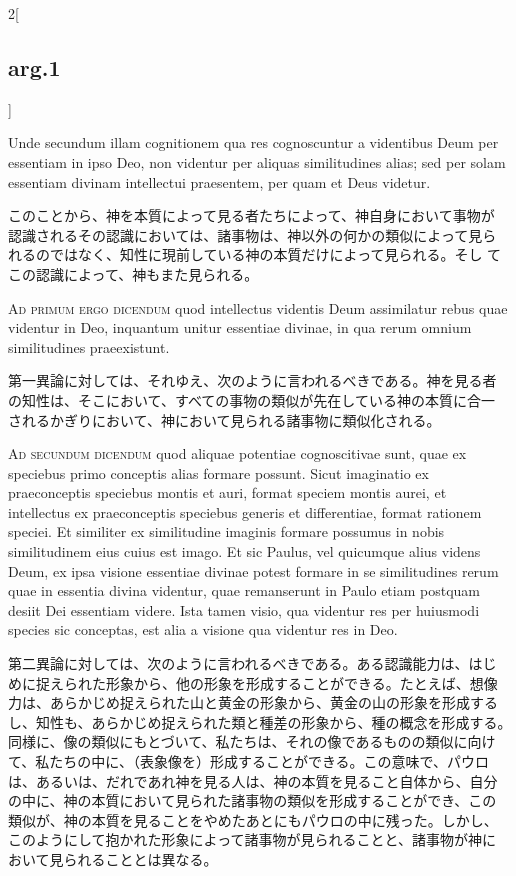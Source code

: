 \documentclass[paper=a4paper,fontsize=10pt,jafontsize=9pt,titlepage]{jlreq}
\begin{document}
\begin{paracol}{2}[\subsection{arg.1}]
\switchcolumn*

Unde secundum illam cognitionem qua res cognoscuntur a videntibus Deum
per essentiam in ipso Deo, non videntur per aliquas similitudines
alias; sed per solam essentiam divinam intellectui praesentem, per
quam et Deus videtur.

\switchcolumn

このことから、神を本質によって見る者たちによって、神自身において事物が
認識されるその認識においては、諸事物は、神以外の何かの類似によって見ら
れるのではなく、知性に現前している神の本質だけによって見られる。そし
てこの認識によって、神もまた見られる。

\switchcolumn*[\subsection{ad.1}]

{\scshape  Ad primum ergo dicendum} quod intellectus videntis Deum
 assimilatur rebus quae videntur in Deo, inquantum unitur essentiae
 divinae, in qua rerum omnium similitudines praeexistunt.

\switchcolumn

第一異論に対しては、それゆえ、次のように言われるべきである。神を見る者
の知性は、そこにおいて、すべての事物の類似が先在している神の本質に合一
されるかぎりにおいて、神において見られる諸事物に類似化される。

\switchcolumn*[\subsection{ad.2}]

{\scshape Ad secundum dicendum} quod aliquae potentiae cognoscitivae sunt,
quae ex speciebus primo conceptis alias formare possunt. Sicut
imaginatio ex praeconceptis speciebus montis et auri, format speciem
montis aurei, et intellectus ex praeconceptis speciebus generis et
differentiae, format rationem speciei. Et similiter ex similitudine
imaginis formare possumus in nobis similitudinem eius cuius est
imago. Et sic Paulus, vel quicumque alius videns Deum, ex ipsa visione
essentiae divinae potest formare in se similitudines rerum quae in
essentia divina videntur, quae remanserunt in Paulo etiam postquam
desiit Dei essentiam videre. Ista tamen visio, qua videntur res per
huiusmodi species sic conceptas, est alia a visione qua videntur res
in Deo.

\switchcolumn

第二異論に対しては、次のように言われるべきである。ある認識能力は、はじ
めに捉えられた形象から、他の形象を形成することができる。たとえば、想像
力は、あらかじめ捉えられた山と黄金の形象から、黄金の山の形象を形成する
し、知性も、あらかじめ捉えられた類と種差の形象から、種の概念を形成する。
同様に、像の類似にもとづいて、私たちは、それの像であるものの類似に向け
て、私たちの中に、（表象像を）形成することができる。この意味で、パウロ
は、あるいは、だれであれ神を見る人は、神の本質を見ること自体から、自分
の中に、神の本質において見られた諸事物の類似を形成することができ、この
類似が、神の本質を見ることをやめたあとにもパウロの中に残った。しかし、
このようにして抱かれた形象によって諸事物が見られることと、諸事物が神に
おいて見られることとは異なる。


\end{paracol}
\end{document}
